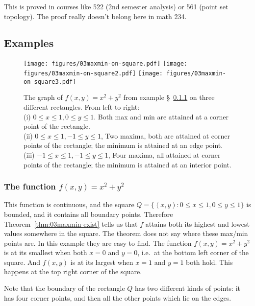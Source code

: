This is proved in courses like 522 (2nd semester analysis) or 561
(point set topology).  The proof really doesn't belong here in math
234.



\subsection{Examples}  %

\label{sec:examples-maxmin-existence} 
\begin{figure}[tb]
   \centering
   \texttt{[image: figures/03maxmin-on-square.pdf]}  
   \texttt{[image: figures/03maxmin-on-square2.pdf]}  
   \texttt{[image: figures/03maxmin-on-square3.pdf]}
   \caption{The graph of $f(x, y) = x^2+y^2$ from example
     \S~\ref{sec:03maxin-exist-parabolic} on three different rectangles.
     From left to right:\\ (i) $0\leq x\leq1, 0\leq y\leq1$.
     Both max and min are attained at a corner point of the rectangle.\\
     (ii) $0\leq x\leq1, -1\leq y\leq1$, Two maxima, both are attained at
     corner points of the rectangle;
     the minimum is attained at an edge point.\\
     (iii) $-1\leq x\leq1, -1\leq y\leq1$, Four maxima, all attained at
     corner points of the rectangle; the minimum is attained at an interior
     point.}
   \label{fig:03maxin-on-square} 
\end{figure}

\subsubsection{The function $f(x, y) = x^2+y^2$}  %

\label{sec:03maxin-exist-parabolic} 
This function is continuous, and the square $Q = \{(x, y) : 0\leq x\leq1,
0\leq y\leq1\}$ is bounded, and it contains all boundary points.  Therefore
Theorem~\ref{thm:03maxmin-exist} tells us that $f$ attains both its highest
and lowest values somewhere in the square. The theorem does not say where
these max/min points are.  In this example they are easy to find.  The
function $f(x, y) = x^2+y^2 $ is at its smallest when both $x=0$ and $y=0$,
i.e.\ at the bottom left corner of the square.  And $f(x,y)$ is at its
largest when $x=1$ and $y=1$ both hold.  This happens at the top right
corner of the square.

Note that the boundary of the rectangle $Q$ has two different kinds of
points: it has four corner points, and then all the other points which lie
on the edges.


